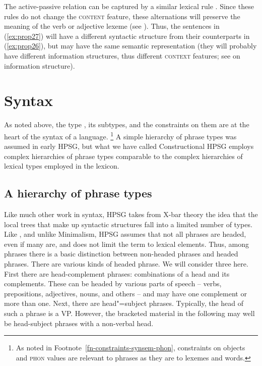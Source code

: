 \documentclass[output=paper
	        ,collection
	        ,collectionchapter
 	        ,biblatex
                ,babelshorthands
                ,newtxmath
                ,draftmode
                ,colorlinks, citecolor=brown
]{langscibook}
\begin{document}
\ea\label{ex:prop28}
\avmtmp{[arg-st & < S > \+ \2] $\mapsto$
	[arg-st & < NP![\type{it}]! > \+ \2 \+ < S >]}
\z

\noindent
The active-passive relation can be captured by a similar lexical rule
\citep[Section~5.1.1]{Flickinger87}. Since these rules do not change the \textsc{content} feature,
these alternations will preserve the meaning of the verb or adjective lexeme (see
). Thus, the sentences in (\ref{ex:prop27}) will have a different
syntactic structure from their counterparts in (\ref{ex:prop26}), but may have the same semantic
representation (they will probably have different information structures, thus different
\textsc{context} features; see  on information structure).


\section{Syntax}\label{sec:prop5}
\label{prop:sec-syntax}

As noted above, the type , its subtypes, and the constraints on them are at the heart of the syntax of a language.%
%
\footnote{As noted in Footnote~\ref{fn-constraints-synsem-phon}, constraints on  objects and \textsc{phon} values are relevant to phrases as they are to lexemes and words.}
%
A simple hierarchy of phrase types was assumed in early HPSG, but what we have called Constructional HPSG employs complex hierarchies of phrase types comparable to the complex hierarchies of lexical types employed in the lexicon.

\subsection{A hierarchy of phrase types}\label{sec:prop5.1}

Like much other work in syntax, HPSG takes from X-bar theory \citep{Jackendoff77a} the idea that the local trees that make up syntactic structures fall into a limited number of types. Like \citet{Jackendoff77a}, and unlike Minimalism\indexmp, HPSG assumes that not all phrases are headed, even if many are, and does not limit the term  to lexical elements. Thus, among phrases there is a basic distinction between non-headed phrases and headed phrases. There are various kinds of headed phrase. We will consider three here. First there are head-complement phrases: combinations of a head and its complements. These can be headed by various parts of speech -- verbs, prepositions, adjectives, nouns, and others -- and may have one complement or more than one. Next, there are head"=subject phrases. Typically, the head of such a phrase is a VP. However, the bracketed material in the following may well be head-subject phrases with a non-verbal head. 
\end{document}
